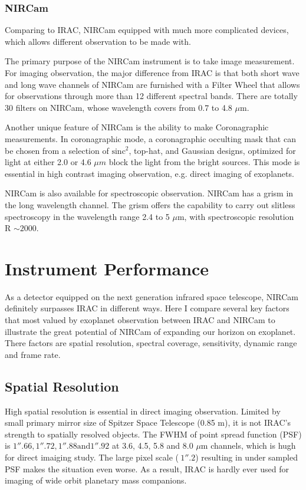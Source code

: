 \documentclass[preprint, 12pt]{aastex}
\begin{document}
\subsubsection{NIRCam}
Comparing to IRAC, NIRCam equipped with much more complicated devices,
which allows different observation to be made with.

The primary purpose of the NIRCam instrument is to take image
measurement. For imaging observation, the major difference from IRAC
is that both short wave and long wave channels of NIRCam are furnished
with a Filter Wheel that allows for observations through more than 12
different spectral bands. There are totally 30 filters on NIRCam,
whose wavelength covers from 0.7 to 4.8 $\mu$m. 

Another unique feature of NIRCam is the ability to make Coronagraphic
measurements. In coronagraphic mode, a coronagraphic occulting mask
that can be chosen from a selection of $\mathrm{sinc}^{2}$, top-hat, and Gaussian
designs, optimized for light at either 2.0 or 4.6 $\mu m$ block the
light from the bright sources. This mode is essential in high contrast
imaging observation, e.g. direct imaging of exoplanets.

NIRCam is also available for spectroscopic observation. NIRCam has a
grism in the long wavelength channel. The grism offers the capability to
carry out slitless spectroscopy in the wavelength range 2.4 to 5 $\mu$m,
with spectroscopic resolution R $\sim 2000$.


\section{Instrument Performance}
As a detector equipped on the next generation infrared space
telescope, NIRCam definitely surpasses IRAC in different ways. Here I
compare several key factors that most valued by exoplanet observation
between IRAC and NIRCam to illustrate the great potential of NIRCam of
expanding our horizon on exoplanet. There factors are spatial
resolution, spectral coverage, sensitivity, dynamic range and frame
rate.\par

\subsection{Spatial Resolution}
High spatial resolution is essential in direct imaging
observation. Limited by small primary mirror size of Spitzer Space
Telescope (0.85 m), it is not IRAC's strength to spatially resolved
objects. The FWHM of point spread function (PSF) is $1''.66, 1''.72,
1''.88 \mbox{and} 1''.92$ at 3.6, 4.5, 5.8 and 8.0 $\mu$m channels,
which is hugh for direct imaiging study. The large pixel scale
($~1''.2$) resulting in under sampled PSF makes the situation even
worse. As a result, IRAC is hardly ever used for imaging of wide
orbit planetary mass companions.\par
\end{document}
